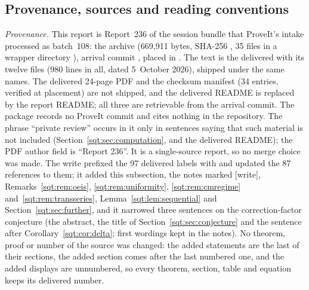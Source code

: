 \subsection{Provenance, sources and reading conventions}\label{sqt:sec:provenance}
\begin{writenote}
\emph{Provenance.} This report is Report~236 of the session bundle that
ProveIt's  intake processed as batch~108: the archive
 (669{,}911 bytes, SHA-256
, 35 files in a wrapper directory
), arrival commit , placed in
. The text is the delivered  with its
twelve files  (980 lines in all, dated 5~October 2026),
shipped under the same names. The delivered 24-page PDF and the checksum
manifest  (34 entries, verified at placement) are not
shipped, and the delivered README is replaced by the report README; all
three are retrievable from the arrival commit. The package records no
ProveIt commit and cites nothing in the repository. The phrase ``private
review'' occurs in it only in sentences saying that such material is not
included (Section~\ref{sqt:sec:computation},  and the
delivered README); the PDF author field is ``Report 236''. It is a
single-source report, so no merge choice was made. The write prefixed the
97 delivered labels with  and updated the 87 references to them;
it added this subsection, the notes marked [write],
Remarks~\ref{sqt:rem:oeis}, \ref{sqt:rem:uniformity},
\ref{sqt:rem:cmregime} and~\ref{sqt:rem:transseries},
Lemma~\ref{sqt:lem:sequential} and Section~\ref{sqt:sec:further}, and it
narrowed three sentences on the correction-factor conjecture (the abstract,
the title of Section~\ref{sqt:sec:conjecture} and the sentence after
Corollary~\ref{sqt:cor:delta}; first wordings kept in the notes). No
theorem, proof or number of the source was changed: the added statements are
the last of their sections, the added section comes after the last numbered
one, and the added displays are unnumbered, so every theorem, section,
table and equation keeps its delivered number.


\end{writenote}
